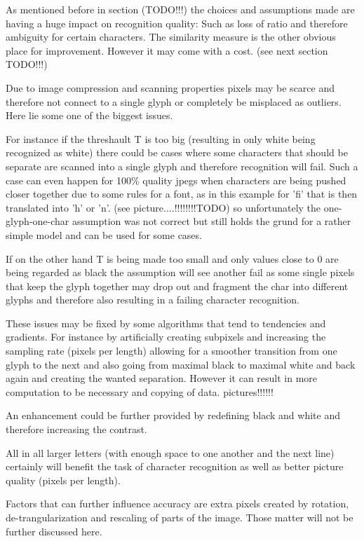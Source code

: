 As mentioned before in section (TODO!!!) the choices and assumptions made are having a huge impact on recognition quality: Such as loss of ratio and therefore ambiguity for certain characters. The similarity measure is the other obvious place for improvement. However it may come with a cost. (see next section TODO!!!)

Due to image compression and scanning properties pixels may be scarce and therefore not connect to a single glyph or completely be misplaced as outliers. Here lie some one of the biggest issues. 

For instance if the threshault T is too big (resulting in only white being recognized as white) there could be cases where some characters that should be separate are scanned into a single glyph and therefore recognition will fail.\newline
Such a case can even happen for 100\% quality jpegs when characters are being pushed closer together due to some rules for a font, as in this example for 'fi' that is then translated into 'h' or 'n'. (see picture....!!!!!!!!TODO) so unfortunately the one-glyph-one-char assumption was not correct but still holds the grund for a rather simple model and can be used for some cases.

If on the other hand T is being made too small and only values close to 0 are being regarded as black the assumption will see another fail as some single pixels that keep the glyph together may drop out and fragment the char into different glyphs and therefore also resulting in a failing character recognition.

These issues may be fixed by some algorithms that tend to tendencies and gradients. For instance by artificially creating subpixels and increasing the sampling rate (pixels per length) allowing for a smoother transition from one glyph to the next and also going from maximal black to maximal white and back again and creating the wanted separation. However it can result in more computation to be necessary and copying of data. pictures!!!!!!

An enhancement could be further provided by redefining black and white and therefore increasing the contrast.

All in all larger letters (with enough space to one another and the next line) certainly will benefit the task of character recognition as well as better picture quality (pixels per length).

Factors that can further influence accuracy are extra pixels created by rotation, de-trangularization and rescaling of parts of the image. Those matter will not be further discussed here.

